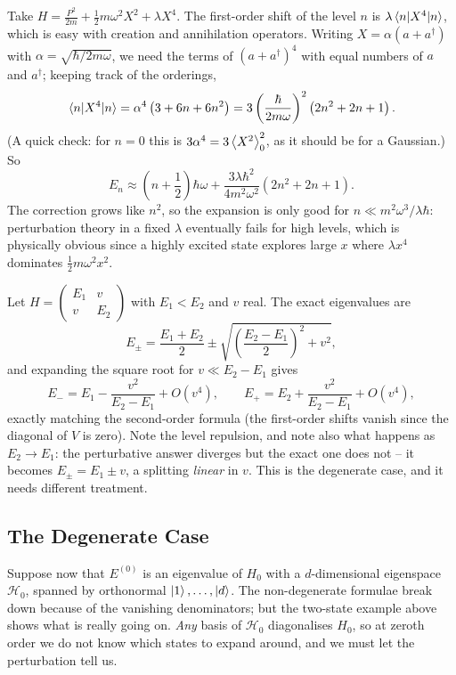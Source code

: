 \documentclass[a4paper]{scrartcl}
\begin{document}
\begin{example}
    Take $H = \frac{P^2}{2m} + \frac12 m\omega^2X^2 + \lambda X^4$. The first-order shift of the level $n$ is $\lambda\mel{n}{X^4}{n}$, which is easy with creation and annihilation operators. Writing $X = \alpha(a+a^\dagger)$ with $\alpha = \sqrt{\hbar/2m\omega}$, we need the terms of $(a+a^\dagger)^4$ with equal numbers of $a$ and $a^\dagger$; keeping track of the orderings,
    $$
    \mel{n}{X^4}{n} = \alpha^4\left( 3 + 6n + 6n^2 \right) = 3\left(\frac{\hbar}{2m\omega}\right)^2\left( 2n^2+2n+1 \right).
    $$
    (A quick check: for $n=0$ this is $3\alpha^4 = 3\expval{X^2}_0^2$, as it should be for a Gaussian.) So
    $$
    E_n \approx \left( n + \frac12 \right)\hbar\omega + \frac{3\lambda\hbar^2}{4m^2\omega^2}\left(2n^2+2n+1\right).
    $$
    The correction grows like $n^2$, so the expansion is only good for $n \ll m^2\omega^3/\lambda\hbar$: perturbation theory in a fixed $\lambda$ eventually fails for high levels, which is physically obvious since a highly excited state explores large $x$ where $\lambda x^4$ dominates $\frac12 m\omega^2x^2$.
\end{example}

\begin{example}
    Let $H = \begin{pmatrix} E_1 & v \\ v & E_2\end{pmatrix}$ with $E_1 < E_2$ and $v$ real. The exact eigenvalues are
    $$
    E_\pm = \frac{E_1+E_2}{2} \pm \sqrt{ \left(\frac{E_2-E_1}{2}\right)^2 + v^2 },
    $$
    and expanding the square root for $v \ll E_2 - E_1$ gives
    $$
    E_- = E_1 - \frac{v^2}{E_2 - E_1} + O(v^4), \qquad E_+ = E_2 + \frac{v^2}{E_2-E_1}+O(v^4),
    $$
    exactly matching the second-order formula (the first-order shifts vanish since the diagonal of $V$ is zero). Note the level repulsion, and note also what happens as $E_2 \to E_1$: the perturbative answer diverges but the exact one does not -- it becomes $E_\pm = E_1 \pm v$, a splitting \emph{linear} in $v$. This is the degenerate case, and it needs different treatment.
\end{example}

\subsection{The Degenerate Case}

Suppose now that $E^{(0)}$ is an eigenvalue of $H_0$ with a $d$-dimensional eigenspace $\mathcal{H}_0$, spanned by orthonormal $\ket{1},\dots,\ket{d}$. The non-degenerate formulae break down because of the vanishing denominators; but the two-state example above shows what is really going on. \emph{Any} basis of $\mathcal{H}_0$ diagonalises $H_0$, so at zeroth order we do not know which states to expand around, and we must let the perturbation tell us.
\end{document}
